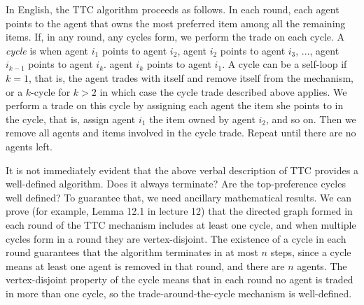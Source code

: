 \documentclass[12pt]{article}
\begin{document}
In English, the TTC algorithm proceeds as follows. In each round, each agent points to the agent that owns the most preferred item among all the remaining items. If, in any round, any cycles form, we perform the trade on each cycle. A \textit{cycle} is when agent $i_1$ points to agent $i_2$, agent $i_2$ points to agent $i_3$, ..., agent $i_{k-1}$ points to agent $i_k$. agent $i_k$ points to agent $i_1$. A cycle can be a self-loop if $k=1$, that is, the agent trades with itself and remove itself from the mechanism, or a $k$-cycle for $k>2$ in which case the cycle trade described above applies. We perform a trade on this cycle by assigning each agent the item she points to in the cycle, that is, assign agent $i_1$ the item owned by agent $i_2$, and so on. Then we remove all agents and items involved in the cycle trade. Repeat until there are no agents left.
 
It is not immediately evident that the above verbal description of TTC provides a well-defined algorithm. Does it always terminate? Are the top-preference cycles well defined? To guarantee that, we need ancillary mathematical results. We can prove (for example, Lemma 12.1 in lecture 12) that the directed graph formed in each round of the TTC mechanism includes at least one cycle, and when multiple cycles form in a round they are vertex-disjoint. The existence of a cycle in each round guarantees that the algorithm terminates in at most $n$ steps, since a cycle means at least one agent is removed in that round, and there are $n$ agents. The vertex-disjoint property of the cycle means that in each round no agent is traded in more than one cycle, so the trade-around-the-cycle mechanism is well-defined. 
 
\end{document}
